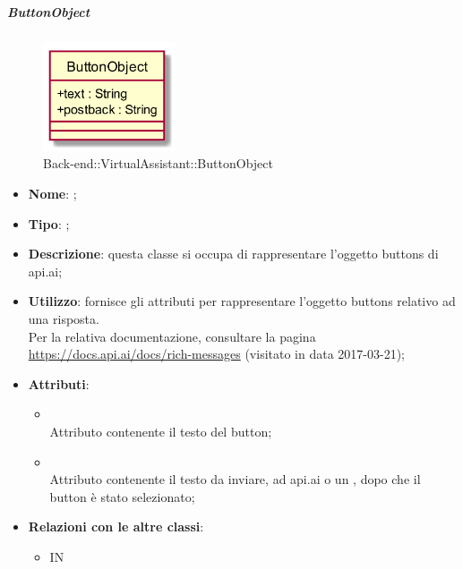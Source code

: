 \hypertarget{ButtonObject_label}{\subparagraph{ButtonObject}}
\begin{figure}[h]
	\centering
	\includegraphics[width=0.35\textwidth,height=\textheight,keepaspectratio]{images/ClassButtonObject.png}
	\caption{Back-end::VirtualAssistant::ButtonObject}
\end{figure}
\begin{itemize}
	\item \textbf{Nome}: ;
	\item \textbf{Tipo}: ;
	\item \textbf{Descrizione}: questa classe si occupa di rappresentare l'oggetto buttons di api.ai;
	\item \textbf{Utilizzo}: fornisce gli attributi per rappresentare l'oggetto buttons relativo ad una risposta. \\
Per la relativa documentazione, consultare la pagina \url{https://docs.api.ai/docs/rich-messages} (visitato in data 2017-03-21);
	\item \textbf{Attributi}:
	\begin{itemize}
		\item[]  \\
		Attributo contenente il testo del button;
		\item[]  \\
		Attributo contenente il testo da inviare, ad api.ai o un , dopo che il button è stato selezionato;
	\end{itemize}
	\item \textbf{Relazioni con le altre classi}:
	\begin{itemize}
		\item IN \hyperlink{MsgObject_label}{}
	\end{itemize}
\end{itemize}
\FloatBarrier


